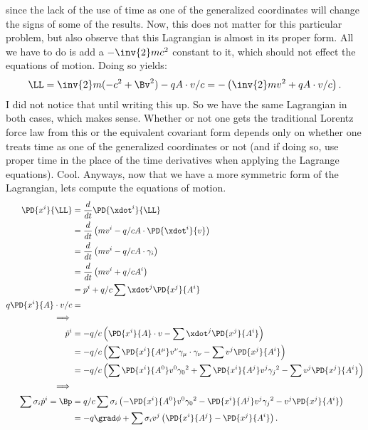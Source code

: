 {since the lack of the use of time as one of the generalized coordinates will change the signs of some of the results.
%
Now, this does not matter for this particular problem, but also observe that this Lagrangian is almost in its proper form.  All we have to do is add a \(-\inv{2} m c^2\) constant to it, which should not effect the equations of motion.  Doing so yields:
%
\begin{equation}\label{eqn:tongMf1:1760}
\LL = \inv{2} m (-c^2 + \Bv^2) - q A \cdot v/c = - \left( \inv{2} mv^2 + q A \cdot v/c \right).
\end{equation}
%
I did not notice that until writing this up.  So we have the same Lagrangian in both cases, which makes sense.  Whether or not one gets the traditional Lorentz force law from this
or the equivalent covariant form depends only on whether one treats time as one of the generalized coordinates or not (and if doing so, use proper time in the place of the time
derivatives when applying the Lagrange equations).  Cool.
%
Anyways, now that we have a more symmetric form of the Lagrangian, lets compute the equations of motion.
%
\begin{equation}\label{eqn:tongMf1:620}
\begin{aligned}
\PD{x^i}{\LL}
&= \frac{d}{dt} \PD{\xdot^i}{\LL} \\
&= \frac{d}{dt} \left(m v^i - q/c A \cdot \PD{\xdot^i}{v} \right) \\
&= \frac{d}{dt} \left(m v^i - q/c A \cdot \gamma_i \right) \\
&= \frac{d}{dt} \left(m v^i + q/c A^i \right) \\
&= p^i + q/c \sum \xdot^j \PD{x^j}{A^i} \\
q \PD{x^i}{A} \cdot v/c &= \\
\implies \\
\dot{p}^i
&= -q/c \left( \PD{x^i}{A} \cdot v - \sum \xdot^j \PD{x^j}{A^i} \right) \\
&= -q/c \left( \sum \PD{x^i}{A^{\mu}} v^{\nu} \gamma_{\mu} \cdot \gamma_{\nu} - \sum v^j \PD{x^j}{A^i} \right) \\
&= -q/c \left( \sum \PD{x^i}{A^0} v^0 {\gamma_0}^2 +\sum \PD{x^i}{A^j} v^j {\gamma_j}^2 - \sum v^j \PD{x^j}{A^i} \right) \\
\implies \\
\sum \sigma_i \dot{p}^i = \Bp
&= q/c \sum \sigma_i \left( -\PD{x^i}{A^0} v^0 {\gamma_0}^2 - \PD{x^i}{A^j} v^j {\gamma_j}^2 - v^j \PD{x^j}{A^i} \right) \\
&= -q \grad \phi + \sum \sigma_i v^j \left( \PD{x^i}{A^j} - \PD{x^j}{A^i} \right) .

\end{aligned}
\end{equation}}
